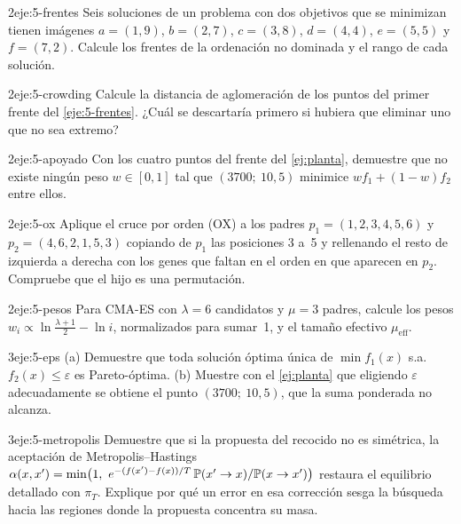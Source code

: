 \begin{ejercicio}{2}{eje:5-frentes}
Seis soluciones de un problema con dos objetivos que se minimizan tienen imágenes $a=(1,9)$, $b=(2,7)$, $c=(3,8)$, $d=(4,4)$, $e=(5,5)$ y $f=(7,2)$. Calcule los frentes de la ordenación no dominada y el rango de cada solución.
\end{ejercicio}

\begin{ejercicio}{2}{eje:5-crowding}
Calcule la distancia de aglomeración de los puntos del primer frente del \cref{eje:5-frentes}. ¿Cuál se descartaría primero si hubiera que eliminar uno que no sea extremo?
\end{ejercicio}

\begin{ejercicio}{2}{eje:5-apoyado}
Con los cuatro puntos del frente del \cref{ej:planta}, demuestre que no existe ningún peso $w\in[0,1]$ tal que $(3700;\ 10{,}5)$ minimice $wf_1+(1-w)f_2$ entre ellos.
\end{ejercicio}

\begin{ejercicio}{2}{eje:5-ox}
Aplique el cruce por orden (OX) a los padres $p_1=(1,2,3,4,5,6)$ y $p_2=(4,6,2,1,5,3)$ copiando de $p_1$ las posiciones 3 a~5 y rellenando el resto de izquierda a derecha con los genes que faltan en el orden en que aparecen en $p_2$. Compruebe que el hijo es una permutación.
\end{ejercicio}

\begin{ejercicio}{2}{eje:5-pesos}
Para CMA-ES con $\lambda=6$ candidatos y $\mu=3$ padres, calcule los pesos $w_i\propto\ln\frac{\lambda+1}{2}-\ln i$, normalizados para sumar~1, y el tamaño efectivo $\mu_{\mathrm{eff}}$.
\end{ejercicio}

\begin{ejercicio}{3}{eje:5-eps}
(a) Demuestre que toda solución óptima única de $\min f_1(x)$ s.a. $f_2(x)\le\varepsilon$ es Pareto-óptima. (b) Muestre con el \cref{ej:planta} que eligiendo $\varepsilon$ adecuadamente se obtiene el punto $(3700;\ 10{,}5)$, que la suma ponderada no alcanza.
\end{ejercicio}

\begin{ejercicio}{3}{eje:5-metropolis}
Demuestre que si la propuesta del recocido no es simétrica, la aceptación de Metropolis--Hastings $\alpha(x,x')=\min\bigl(1,\ e^{-(f(x')-f(x))/T}\,\Prob(x'\to x)/\Prob(x\to x')\bigr)$ restaura el equilibrio detallado con $\pi_T$. Explique por qué un error en esa corrección sesga la búsqueda hacia las regiones donde la propuesta concentra su masa.
\end{ejercicio}
